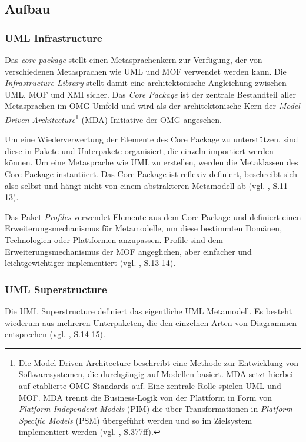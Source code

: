 \subsection{Aufbau}

\subsubsection{UML Infrastructure}
Das \emph{core package} stellt einen Metasprachenkern zur Verfügung, der von verschiedenen Metasprachen wie UML und MOF verwendet werden kann. Die \emph{Infrastructure Library} stellt damit eine architektonische Angleichung zwischen UML, MOF und XMI sicher. Das \emph{Core Package} ist der zentrale Bestandteil aller Metasprachen im OMG Umfeld und wird als der architektonische Kern der \emph{Model Driven Architecture}\footnote{Die Model Driven Architecture beschreibt eine Methode zur Entwicklung von Softwaresystemen, die durchgängig auf Modellen basiert. MDA setzt hierbei auf etablierte OMG Standards auf. Eine zentrale Rolle spielen UML und MOF. MDA trennt die Business-Logik von der Plattform in Form von \emph{Platform Independent Models} (PIM) die über Transformationen in \emph{Platform Specific Models} (PSM) übergeführt werden und so im Zielsystem implementiert werden (vgl. \citep{MDSD2007}, S.377ff).} (MDA) Initiative der OMG angesehen.

Um eine Wiederverwertung der Elemente des Core Package zu unterstützen, sind diese in Pakete und Unterpakete organisiert, die einzeln importiert werden können. Um eine Metasprache wie UML zu erstellen, werden die Metaklassen des Core Package instantiiert.  Das Core Package ist reflexiv definiert, beschreibt sich also selbst und hängt nicht von einem abstrakteren Metamodell ab (vgl. \citep{OMG20092}, S.11-13).

Das Paket \emph{Profiles} verwendet Elemente aus dem Core Package und definiert einen Erweiterungsmechanismus für Metamodelle, um diese bestimmten Domänen, Technologien oder Plattformen anzupassen. Profile sind dem Erweiterungsmechanismus der MOF angeglichen, aber einfacher und leichtgewichtiger implementiert (vgl. \citep{OMG20092}, S.13-14).


\subsubsection{UML Superstructure}
Die UML Superstructure definiert das eigentliche UML Metamodell. Es besteht wiederum aus mehreren Unterpaketen, die den einzelnen Arten von Diagrammen entsprechen (vgl. \citep{OMG20092}, S.14-15).

